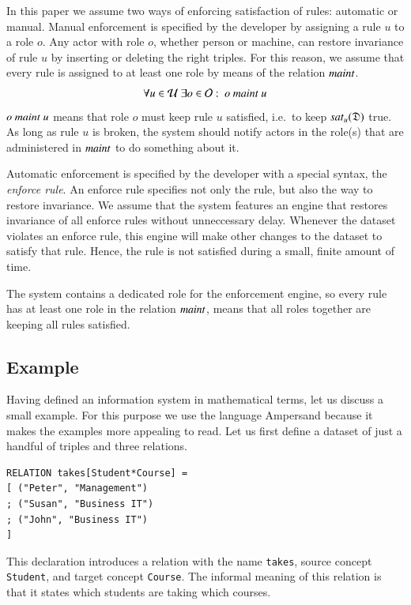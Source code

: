 \documentclass{elsarticle}
\begin{document}
   In this paper we assume two ways of enforcing satisfaction of rules: automatic or manual.
   Manual enforcement is specified by the developer by assigning a rule $u$ to a role $o$.
   Any actor with role $o$, whether person or machine,
   can restore invariance of rule $u$ by inserting or deleting the right triples.
   For this reason, we assume that every rule is assigned to at least one role by means of the relation $\text{\it maint\/}$.
\begin{equation}
   \forall u\in\rules\ \exists o\in\roles:\ o\ \maintain\ u\label{eqn:maintain}
\end{equation}
   $o\ \maintain\ u$ means that role $o$ must keep rule $u$ satisfied, i.e.\ to keep $\text{\it sat\/}_{u}(\mathfrak{D})$ true.
   As long as rule $u$ is broken, the system should notify actors in the role(s) that are administered in $\text{\it maint\/}$ to do something about it.

   Automatic enforcement is specified by the developer with a special syntax,
   the {\em enforce rule}.
   An enforce rule specifies not only the rule, but also the way to restore invariance.
   We assume that the system features an engine that restores invariance of all enforce rules without unneccessary delay.
   Whenever the dataset violates an enforce rule,
   this engine will make other changes to the dataset to satisfy that rule.
   Hence, the rule is not satisfied during a small, finite amount of time.

   The system contains a dedicated role for the enforcement engine,
   so every rule has at least one role in the relation $\text{\it maint\/}$, means that all roles together are keeping all rules satisfied.

\subsection{Example}
\label{sct:Example old IS}
\label{old IS}
   Having defined an information system in mathematical terms, let us discuss a small example.
   For this purpose we use the language Ampersand
   because it makes the examples more appealing to read.
   Let us first define a dataset of just a handful of triples and three relations.
\begin{verbatim}
RELATION takes[Student*Course] =
[ ("Peter", "Management")
; ("Susan", "Business IT")
; ("John", "Business IT")
]
\end{verbatim}
   This declaration introduces a relation with the name \verb#takes#,
   source concept \verb#Student#, and
   target concept \verb#Course#.
   The informal meaning of this relation is that it states which students are taking which courses.
\end{document}
